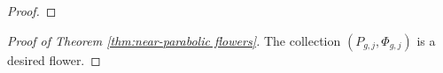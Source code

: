 \documentclass[12pt,letterpaper]{amsart}
\numberwithin{equation}{section}
\theoremstyle{remark}
\theoremstyle{definition}
\newcommand{\QQ}{\mathcal Q}
\begin{document}
\begin{proof}
% 		
% 		
 	\end{proof}
 	
 	
 	
 	\begin{proof}[Proof of Theorem \ref{thm:near-parabolic flowers}]
 		The collection $(P_{g, j}, \Phi_{g, j})$ is a desired flower.
 	\end{proof}
 	
\end{document}
